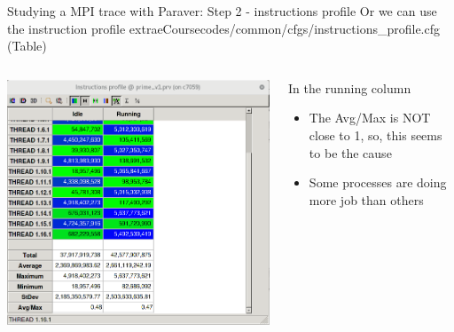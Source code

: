 \documentclass[10pt,xcolor=table]{beamer}
\begin{document}
\begin{frame}{Studying a MPI trace with Paraver: Step 2 - instructions profile}
Or we can use the instruction profile extraeCoursecodes/common/cfgs/instructions\_profile.cfg (Table)

\begin{columns}
\begin{column}{0.5\textwidth}
  \includegraphics[width=\textwidth]{figs/ins_profile_table.png}
\end{column}
\begin{column}{0.5\textwidth}
In the running column
  \begin{itemize}
      \item The Avg/Max is  NOT close to 1, so, this  seems to be the cause
      \item Some processes are doing more job than others
  \end{itemize}
\end{column}
\end{columns}
\end{frame}
\end{document}
